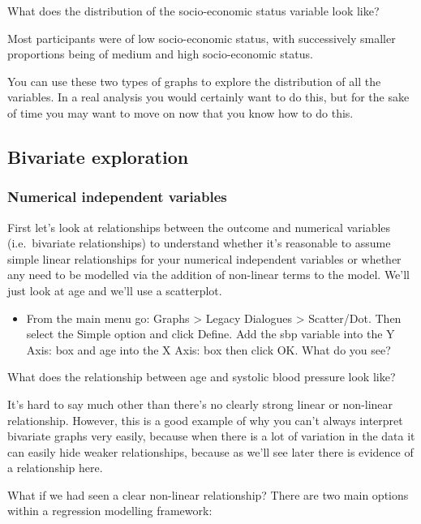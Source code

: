 \documentclass[
]{book}
\providecommand{\tightlist}{%
  \setlength{\itemsep}{0pt}\setlength{\parskip}{0pt}}
\begin{document}
What does the distribution of the socio-economic status variable look like?

Most participants were of low socio-economic status, with successively smaller proportions being of medium and high socio-economic status.

You can use these two types of graphs to explore the distribution of all the variables. In a real analysis you would certainly want to do this, but for the sake of time you may want to move on now that you know how to do this.

\hypertarget{bivariate-exploration}{%
\subsection{Bivariate exploration}\label{bivariate-exploration}}

\hypertarget{numerical-independent-variables}{%
\subsubsection{Numerical independent variables}\label{numerical-independent-variables}}

First let's look at relationships between the outcome and numerical variables (i.e.~bivariate relationships) to understand whether it's reasonable to assume simple linear relationships for your numerical independent variables or whether any need to be modelled via the addition of non-linear terms to the model. We'll just look at age and we'll use a scatterplot.

\begin{itemize}
\tightlist
\item
  From the main menu go: Graphs \textgreater{} Legacy Dialogues \textgreater{} Scatter/Dot. Then select the Simple option and click Define. Add the sbp variable into the Y Axis: box and age into the X Axis: box then click OK. What do you see?
\end{itemize}

What does the relationship between age and systolic blood pressure look like?

It's hard to say much other than there's no clearly strong linear or non-linear relationship. However, this is a good example of why you can't always interpret bivariate graphs very easily, because when there is a lot of variation in the data it can easily hide weaker relationships, because as we'll see later there is evidence of a relationship here.

What if we had seen a clear non-linear relationship? There are two main options within a regression modelling framework:
\end{document}
